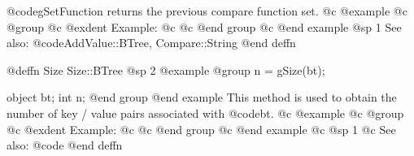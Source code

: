 @code{gSetFunction} returns the previous compare function set.
@c @example
@c @group
@c @exdent Example:
@c 
@c @end group
@c @end example
@sp 1
See also:  @code{AddValue::BTree, Compare::String}
@end deffn






















@deffn {Size} Size::BTree
@sp 2
@example
@group
n = gSize(bt);

object  bt;
int     n;
@end group
@end example
This method is used to obtain the number of key / value pairs associated
with @code{bt}.
@c @example
@c @group
@c @exdent Example:
@c 
@c @end group
@c @end example
@c @sp 1
@c See also:  @code{}
@end deffn



















